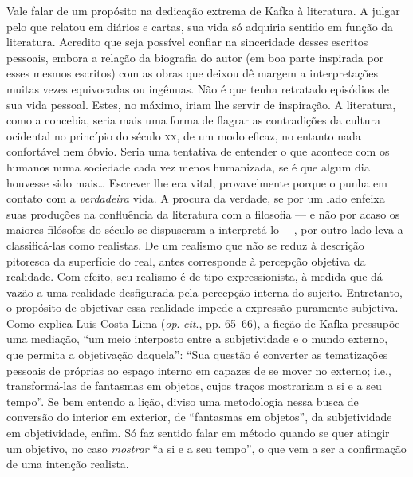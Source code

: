 Vale falar de um propósito na dedicação extrema de Kafka à literatura. A
julgar pelo que relatou em diários e cartas, sua vida só adquiria
sentido em função da literatura. Acredito que seja possível confiar na
sinceridade desses escritos pessoais, embora a relação da biografia do
autor (em boa parte inspirada por esses mesmos escritos) com as obras
que deixou dê margem a interpretações muitas vezes equivocadas ou
ingênuas. Não é que tenha retratado episódios de sua vida pessoal.
Estes, no máximo, iriam lhe servir de inspiração. A literatura, como a
concebia, seria mais uma forma de flagrar as contradições da cultura
ocidental no princípio do século \textsc{xx}, de um modo eficaz, no entanto nada
confortável nem óbvio. Seria uma tentativa de entender o que acontece
com os humanos numa sociedade cada vez menos humanizada, se é que algum
dia houvesse sido mais\ldots{} Escrever lhe era vital, provavelmente porque
o punha em contato com a \textit{verdadeira} vida. A procura da
verdade, se por um lado enfeixa suas produções na confluência da
literatura com a filosofia --- e não por acaso os maiores filósofos do
século se dispuseram a interpretá-lo ---, por outro lado leva a
classificá-las como realistas. De um realismo que não se reduz à
descrição pitoresca da superfície do real, antes corresponde à
percepção objetiva da realidade. Com efeito, seu realismo é de tipo
expressionista, à medida que dá vazão a uma realidade desfigurada pela
percepção interna do sujeito. Entretanto, o propósito de objetivar essa
realidade impede a expressão puramente subjetiva. Como explica 
Luis Costa Lima (\textit{op}. \textit{cit}., pp. 65--66), a ficção
de Kafka pressupõe uma mediação, “um meio interposto entre a
subjetividade e o mundo externo, que permita a objetivação daquela”:
“Sua questão é converter as tematizações pessoais de próprias ao espaço
interno em capazes de se mover no externo; i.e., transformá-las de
fantasmas em objetos, cujos traços mostrariam a si e a seu tempo”. Se
bem entendo a lição, diviso uma metodologia nessa busca de conversão do
interior em exterior, de “fantasmas em objetos”, da subjetividade em
objetividade, enfim. Só faz sentido falar em método quando se quer
atingir um objetivo, no caso \textit{mostrar} “a si e a seu tempo”, o
que vem a ser a confirmação de uma intenção realista.

